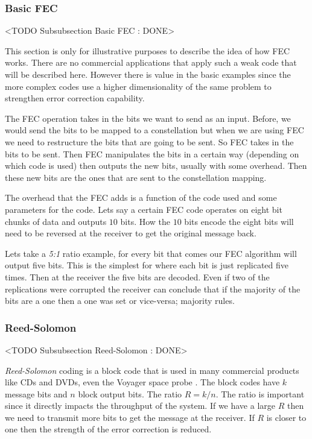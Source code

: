 	
\subsubsection{Basic FEC}
	<TODO Subsubsection  Basic FEC : DONE>

This section is only for illustrative purposes to describe the idea of how \ac{FEC} works. There are no commercial applications that apply such a weak code that will be described here. However there is value in the basic examples since the more complex codes use a higher dimensionality of the same problem to strengthen error correction capability.

The \ac{FEC} operation takes in the bits we want to send as an input. Before, we would send the bits to be mapped to a constellation but when we are using \ac{FEC} we need to restructure the bits that are going to be sent. So \ac{FEC} takes in the bits to be sent. Then \ac{FEC} manipulates the bits in a certain way (depending on which code is used) then outputs the new bits, usually with some overhead. Then these new bits are the ones that are sent to the constellation mapping.

The overhead that the \ac{FEC} adds is a function of the code used and some parameters for the code. Lets say a certain \ac{FEC} code operates on eight bit chunks of data and outputs $10$ bits. How the $10$ bits encode the eight bits will need to be reversed at the receiver to get the original message back.  

Lets take a \emph{5:1} ratio example, for every bit that comes our \ac{FEC} algorithm will output five bits. This is the simplest for where each bit is just replicated five times. Then at the receiver the five bits are decoded. Even if two of the replications were corrupted the receiver can conclude that if the majority of the bits are a one then a one was set or vice-versa; majority rules.
	
\subsubsection{Reed-Solomon}
	<TODO Subsubsection  Reed-Solomon : DONE>

\emph{Reed-Solomon} coding is a block code that is used in many commercial products like \ac{CD}s and \ac{DVD}s, even the Voyager space probe \cite{voyager}. The block codes have $k$ message bits and $n$ block output bits. The ratio $R=k/n$. The ratio is important since it directly impacts the throughput of the system. If we have a large $R$ then we need to transmit more bits to get the message at the receiver. If $R$ is closer to one then the strength of the error correction is reduced.

